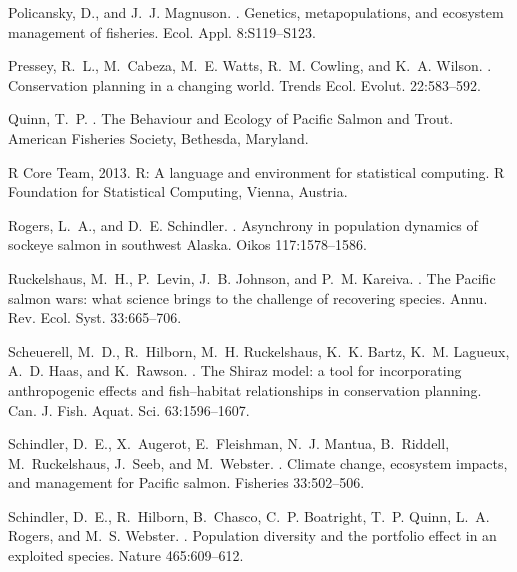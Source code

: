 \documentclass[12pt,english]{article}
\begin{document}
\begin{spacing}{1.9}
\begin{thebibliography}{64}
Policansky, D., and J.~J. Magnuson.
.
\newblock Genetics, metapopulations, and ecosystem management of fisheries.
\newblock Ecol. Appl. 8:S119--S123.

Pressey, R.~L., M.~Cabeza, M.~E. Watts, R.~M. Cowling, and K.~A. Wilson.
.
\newblock Conservation planning in a changing world.
\newblock Trends Ecol. Evolut. 22:583--592.

Quinn, T.~P.
.
\newblock The Behaviour and Ecology of Pacific Salmon and Trout.
\newblock American Fisheries Society, Bethesda, Maryland.

{\textsf{R} Core Team}, 2013.
\newblock \textsf{R}: {A} language and environment for statistical computing.
\newblock \textsf{R} Foundation for Statistical Computing, Vienna, Austria.

Rogers, L.~A., and D.~E. Schindler.
.
\newblock Asynchrony in population dynamics of sockeye salmon in southwest
  {Alaska}.
\newblock Oikos 117:1578--1586.

Ruckelshaus, M.~H., P.~Levin, J.~B. Johnson, and P.~M. Kareiva.
.
\newblock The {Pacific} salmon wars: what science brings to the challenge of
  recovering species.
\newblock Annu. Rev. Ecol. Syst. 33:665--706.

Scheuerell, M.~D., R.~Hilborn, M.~H. Ruckelshaus, K.~K. Bartz, K.~M. Lagueux,
  A.~D. Haas, and K.~Rawson.
.
\newblock The {Shiraz} model: a tool for incorporating anthropogenic effects
  and fish--habitat relationships in conservation planning.
\newblock Can. J. Fish. Aquat. Sci. 63:1596--1607.

Schindler, D.~E., X.~Augerot, E.~Fleishman, N.~J. Mantua, B.~Riddell,
  M.~Ruckelshaus, J.~Seeb, and M.~Webster.
.
\newblock Climate change, ecosystem impacts, and management for {Pacific}
  salmon.
\newblock Fisheries 33:502--506.

Schindler, D.~E., R.~Hilborn, B.~Chasco, C.~P. Boatright, T.~P. Quinn, L.~A.
  Rogers, and M.~S. Webster.
.
\newblock Population diversity and the portfolio effect in an exploited
  species.
\newblock Nature 465:609--612.


\end{thebibliography}
\end{spacing}
\end{document}
